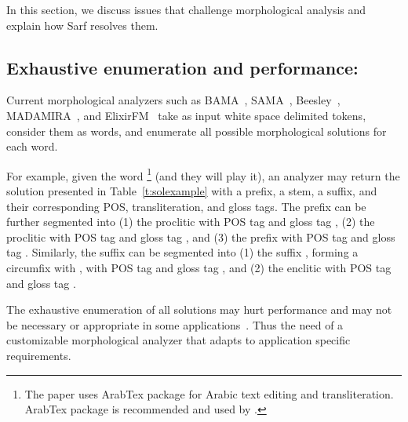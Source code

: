 In this section, we discuss issues that %
challenge morphological analysis and explain how Sarf resolves them. 

\subsection{Exhaustive enumeration and performance:}

Current morphological analyzers such as 
BAMA~\citep*{Buckwalter:02}, 
SAMA~\citep*{SAMAmain, Kulick:10},  
Beesley~\citep*{Beesley:01}, 
MADAMIRA~\citep*{pasha2014madamira}, 
and ElixirFM~\citep*{Otakar:07} 
take as input white space delimited tokens,
consider them as words,
and enumerate all possible morphological solutions for each word. 



For example, given the word \footnote{The paper uses ArabTex package \citep{arabtex} for Arabic text editing and transliteration. ArabTex package is recommended and used by \citep{IntroNHabash}.} (and they will play it), 
an analyzer may return the solution presented in Table~\ref{t:solexample} with 
a prefix, a stem, a suffix, and their corresponding 
POS, transliteration, and gloss tags. 
The prefix 
 can be further segmented into 
(1) the proclitic  with POS tag  and gloss tag ,
(2) the proclitic  with POS tag  and gloss tag ,
and (3) the prefix  with POS tag  and gloss tag .
Similarly, the suffix 
can be segmented into
(1) the suffix , forming a circumfix with , 
with POS tag 
and gloss tag \cci{[MASC.PL.]}, 
and (2) the enclitic  with POS tag 
and gloss tag . 
\novocalize

The exhaustive enumeration of all solutions may hurt performance and may
not be necessary or appropriate
in some applications~\citep*{Maamouri:10}. 
Thus the need of a customizable morphological analyzer that adapts to 
application specific requirements.

